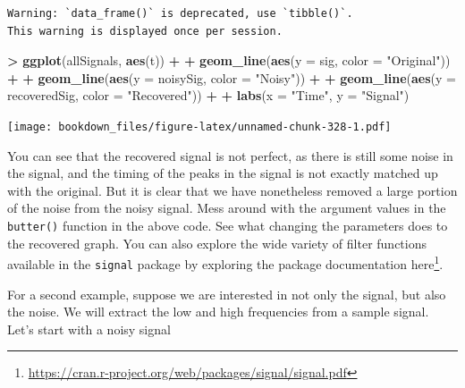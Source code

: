 \documentclass[
]{krantz}
\makeatletter
\newenvironment{Shaded}{\begin{snugshade}}{\end{snugshade}}
\newcommand{\DataTypeTok}[1]{\textcolor[rgb]{0.27,0.27,0.27}{#1}}
\newcommand{\KeywordTok}[1]{\textcolor[rgb]{0.27,0.27,0.27}{\textbf{#1}}}
\newcommand{\NormalTok}[1]{#1}
\newcommand{\OperatorTok}[1]{\textcolor[rgb]{0.43,0.43,0.43}{\textbf{#1}}}
\newcommand{\StringTok}[1]{\textcolor[rgb]{0.5,0.5,0.5}{#1}}
\renewcommand{\href}[2]{#2\footnote{\url{#1}}}
\newenvironment{kframe}{%
\medskip{}
\setlength{\fboxsep}{.8em}
 \def\at@end@of@kframe{}%
 \ifinner\ifhmode%
  \def\at@end@of@kframe{\end{minipage}}%
  \begin{minipage}{\columnwidth}%
 \fi\fi%
 \def\FrameCommand##1{\hskip\@totalleftmargin \hskip-\fboxsep
 \colorbox{shadecolor}{##1}\hskip-\fboxsep
     \hskip-\linewidth \hskip-\@totalleftmargin \hskip\columnwidth}%
 \MakeFramed {\advance\hsize-\width
   \@totalleftmargin\z@ \linewidth\hsize
   \@setminipage}}%
 {\par\unskip\endMakeFramed%
 \at@end@of@kframe}
\renewenvironment{Shaded}{\begin{kframe}}{\end{kframe}}
\makeatother
\begin{document}
\begin{verbatim}
Warning: `data_frame()` is deprecated, use `tibble()`.
This warning is displayed once per session.
\end{verbatim}

\begin{Shaded}
\begin{Highlighting}[]
\OperatorTok{\textgreater{}}\StringTok{ }\KeywordTok{ggplot}\NormalTok{(allSignals, }\KeywordTok{aes}\NormalTok{(t)) }\OperatorTok{+}\StringTok{ }
\OperatorTok{+}\StringTok{   }\KeywordTok{geom\_line}\NormalTok{(}\KeywordTok{aes}\NormalTok{(}\DataTypeTok{y =}\NormalTok{ sig, }\DataTypeTok{color =} \StringTok{"Original"}\NormalTok{)) }\OperatorTok{+}\StringTok{ }
\OperatorTok{+}\StringTok{   }\KeywordTok{geom\_line}\NormalTok{(}\KeywordTok{aes}\NormalTok{(}\DataTypeTok{y =}\NormalTok{ noisySig, }\DataTypeTok{color =} \StringTok{"Noisy"}\NormalTok{)) }\OperatorTok{+}\StringTok{ }
\OperatorTok{+}\StringTok{   }\KeywordTok{geom\_line}\NormalTok{(}\KeywordTok{aes}\NormalTok{(}\DataTypeTok{y =}\NormalTok{ recoveredSig, }\DataTypeTok{color =} \StringTok{"Recovered"}\NormalTok{)) }\OperatorTok{+}\StringTok{ }
\OperatorTok{+}\StringTok{   }\KeywordTok{labs}\NormalTok{(}\DataTypeTok{x =} \StringTok{"Time"}\NormalTok{, }\DataTypeTok{y =} \StringTok{"Signal"}\NormalTok{)}
\end{Highlighting}
\end{Shaded}

\texttt{[image: bookdown\_files/figure-latex/unnamed-chunk-328-1.pdf]}

You can see that the recovered signal is not perfect, as there is still some noise in the signal, and the timing of the peaks in the signal is not exactly matched up with the original. But it is clear that we have nonetheless removed a large portion of the noise from the noisy signal. Mess around with the argument values in the \texttt{butter()} function in the above code. See what changing the parameters does to the recovered graph. You can also explore the wide variety of filter functions available in the \texttt{signal} package by exploring the package documentation \href{https://cran.r-project.org/web/packages/signal/signal.pdf}{here}.

For a second example, suppose we are interested in not only the signal, but also the noise. We will extract the low and high frequencies from a sample signal. Let's start with a noisy signal
\end{document}
